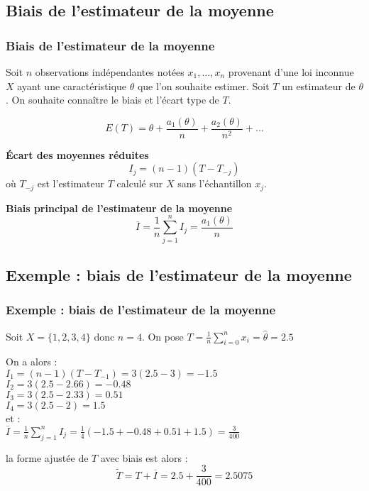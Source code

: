 \documentclass[handout]{beamer}
\begin{document}
		\subsection{Biais de l'estimateur de la moyenne}
			\begin{frame}
			\frametitle{Biais de l'estimateur de la moyenne}
			Soit $n$ observations indépendantes notées $x_1, \dots, x_n$ provenant d'une loi inconnue $X$ ayant une caractéristique $\theta$ que l'on souhaite estimer. Soit $T$ un estimateur de $\theta$. On souhaite connaître le biais et l'écart type de $T$.

			\begin{equation}
				E(T) = \theta + \frac{a_{1}(\theta)}{n} + \frac{a_{2}(\theta)}{n^2} + \dots
			\end{equation}

			\textbf{Écart des moyennes réduites}
			\begin{equation}
				I_j = (n - 1)(T - T_{-j})
			\end{equation}
			où $T_{-j}$ est l'estimateur $T$ calculé sur $X$ sans l'échantillon $x_j$.

			\vspace{5px}
			\textbf{Biais principal de l'estimateur de la moyenne}
			\begin{equation}
				\overline{I} = \frac{1}{n} \sum\limits_{j=1}^n I_j = \frac{a_{1}(\theta)}{n}
			\end{equation}

		\end{frame}

		\subsection{Exemple : biais de l'estimateur de la moyenne}
			\begin{frame}
			\frametitle{Exemple : biais de l'estimateur de la moyenne}
			Soit $X = \{1, 2, 3, 4\}$ donc $n = 4$. On pose $T = \frac{1}{n} \sum\limits_{i=0}^n x_i  = \hat{\theta} = 2.5$

			On a alors :\\
			$I_1 = (n - 1)(T - T_{-1}) = 3 (2.5 - 3) = -1.5$\\
			$I_2 = 3 (2.5 - 2.66) = -0.48$\\
			$I_3 = 3 (2.5 - 2.33) = 0.51$\\
			$I_4 = 3 (2.5 - 2) = 1.5$\\

			\vspace{5px}
			et :\\
			$\overline{I} = \frac{1}{n} \sum\limits_{j=1}^n I_j = \frac{1}{4} (-1.5 + -0.48 + 0.51 + 1.5) = \frac{3}{400}$

			\vspace{5px}
			la forme ajustée de $T$ avec biais est alors :\\
			\[ \tilde{T} = T + \overline{I} = 2.5 + \frac{3}{400} = 2.5075 \]

		\end{frame}
\end{document}
